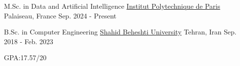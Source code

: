 

\begin{cventries}

    \cventry%
      {M.Sc. in Data and Artificial Intelligence} %
      {\href{https://www.ip-paris.fr/}{Institut Polytechnique de Paris}} %
      {Palaiseau, France} %
      {Sep. 2024 - Present} %
      {
      }
  

  \cventry%
    {B.Sc. in Computer Engineering} %
    {\href{https://en.sbu.ac.ir/}{Shahid Beheshti University}} %
    {Tehran, Iran} %
    {Sep. 2018 - Feb. 2023} %
    {%
      \begin{cvitems} %
        \item {GPA:\@ 17.57/20}
      \end{cvitems}
    }





\end{cventries}

